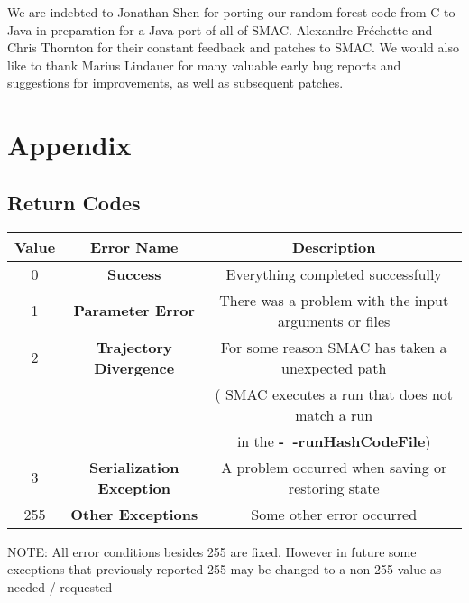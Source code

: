 \documentclass[11pt,letterpaper,oneside]{article}
\begin{document}
We are indebted to Jonathan Shen for porting our random forest code from C to Java in preparation for a Java port of all of SMAC. Alexandre Fr\'echette and Chris Thornton for their constant feedback and patches to SMAC.  We would also like to thank Marius Lindauer for many valuable early bug reports and suggestions for improvements, as well as subsequent patches.



\renewcommand{\bibsection}{\section{References}}




\section{Appendix}
\subsection{Return Codes}

\begin{table}[h]
\begin{tabular}{| c | c | c |}
\hline
Value & Error Name & Description \\
\hline
\hline
0 & \textbf{Success} & Everything completed successfully \\
\hline
1 & \textbf{Parameter Error} & There was a problem with the input arguments or files  \\
\hline
2 & \textbf{Trajectory Divergence} & For some reason SMAC has taken a unexpected path \\

& & (\eg{} SMAC executes a run that does not match a run \\
& & in the \textbf{-~$\!\!$-runHashCodeFile}) \\
\hline
3 & \textbf{Serialization Exception} & A problem occurred when saving or restoring state \\
\hline
255 & \textbf{Other Exceptions} & Some other error occurred \\
\hline
\end{tabular}
\end{table}

\textsc{NOTE:} All error conditions besides 255 are fixed. However in future some exceptions that previously reported 255 may be changed to a non 255 value as needed / requested
\\
\\
\\
\\
\\
\\
\end{document}
